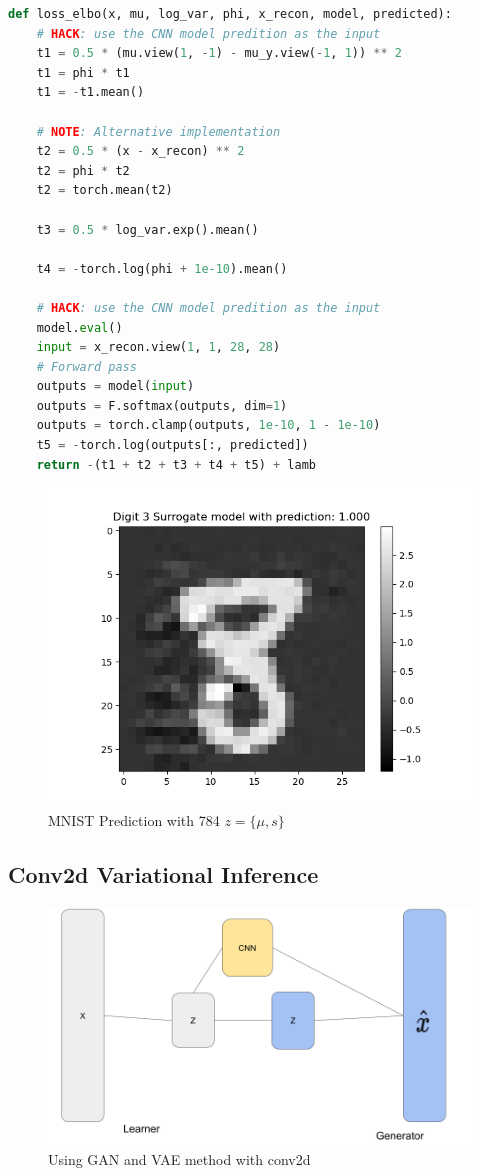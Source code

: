 \documentclass[12pt]{article}
\begin{document}
  \begin{lstlisting}[language=Python, caption= Full connected VI loss function]
def loss_elbo(x, mu, log_var, phi, x_recon, model, predicted):
    # HACK: use the CNN model predition as the input
    t1 = 0.5 * (mu.view(1, -1) - mu_y.view(-1, 1)) ** 2
    t1 = phi * t1
    t1 = -t1.mean()

    # NOTE: Alternative implementation
    t2 = 0.5 * (x - x_recon) ** 2
    t2 = phi * t2
    t2 = torch.mean(t2)

    t3 = 0.5 * log_var.exp().mean()

    t4 = -torch.log(phi + 1e-10).mean()

    # HACK: use the CNN model predition as the input
    model.eval()
    input = x_recon.view(1, 1, 28, 28)
    # Forward pass
    outputs = model(input)
    outputs = F.softmax(outputs, dim=1)
    outputs = torch.clamp(outputs, 1e-10, 1 - 1e-10)
    t5 = -torch.log(outputs[:, predicted])
    return -(t1 + t2 + t3 + t4 + t5) + lamb
\end{lstlisting}

\begin{figure}[H]
    \centering
    \includegraphics[width=0.7\linewidth]{../fig/ID 3-Digit 8 pred 3 new_image.png} %
    \caption{MNIST Prediction with 784 $z=\{\mu,s \}$ }
    \label{fig:naive_bayes}
\end{figure}

\subsection{Conv2d Variational Inference}
\begin{figure}[H]
    \centering
    \includegraphics[width=0.5\linewidth]{../fig/GANandVAE.png} %
    \caption{Using GAN and VAE method with conv2d }
    \label{fig:GANandVAE}
\end{figure}
\end{document}

